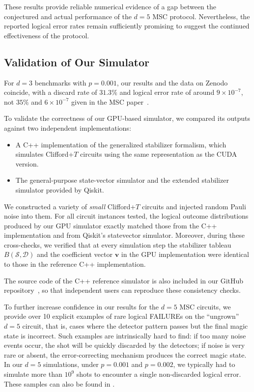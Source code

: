 \documentclass[10pt,conference]{IEEEtran}
\begin{document}
These results provide reliable numerical evidence of a gap between the conjectured and actual performance of the $d=5$ MSC protocol. Nevertheless, the reported logical error rates remain sufficiently promising to suggest the continued effectiveness of the protocol.

\subsection{Validation of Our Simulator}
\label{subsec:validation}
For $d=3$ benchmarks with $p=0.001$, our results and the data on Zenodo~\cite{GidneyZenodo} coincide, with a discard rate of $31.3\%$ and logical error rate of around $9\times10^{-7}$, not $35\%$ and $6\times10^{-7}$ given in the MSC paper~\cite{gidney2024magic}.

To validate the correctness of our GPU-based simulator, we compared its outputs against two independent implementations:

\begin{itemize}
    \item A C++ implementation of the generalized stabilizer formalism, which simulates Clifford+$T$ circuits using the same representation as the CUDA version.
    \item The general-purpose state-vector simulator and the extended stabilizer simulator provided by Qiskit.
\end{itemize}

We constructed a variety of \textit{small} Clifford+$T$ circuits and injected random Pauli noise into them.
For all circuit instances tested, the logical outcome distributions produced by our GPU simulator exactly matched those from the C++ implementation and from Qiskit's statevector simulator.
Moreover, during these cross-checks, we verified that at every simulation step the stabilizer tableau $B(\mathcal{S}, \mathcal{D})$ and the coefficient vector $\mathbf{v}$ in the GPU implementation were identical to those in the reference C++ implementation.

The source code of the C++ reference simulator is also included in our GitHub repository~\cite{SOFT2025}, so that independent users can reproduce these consistency checks.

To further increase confidence in our results for the $d=5$ MSC circuits, we provide over 10 explicit examples of rare logical FAILUREs on the ``ungrown'' $d=5$ circuit, that is, cases where the detector pattern passes but the final magic state is incorrect.
Such examples are intrinsically hard to find: if too many noise events occur, the shot will be quickly discarded by the detectors; if noise is very rare or absent, the error-correcting mechanism produces the correct magic state.
In our $d=5$ simulations, under $p=0.001$ and $p=0.002$, we typically had to simulate more than $10^9$ shots to encounter a single non-discarded logical error. These samples can also be found in \cite{SOFT2025}.
\end{document}
